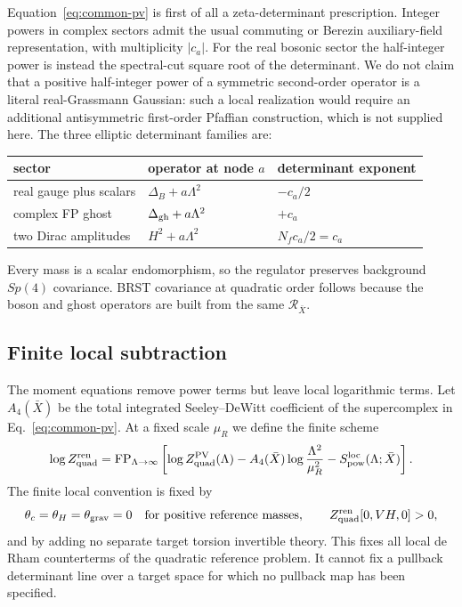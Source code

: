 \documentclass[11pt]{article}
\theoremstyle{definition}
\theoremstyle{remark}
\newcommand{\cR}{\mathcal R}
\newcommand{\FP}{\operatorname{FP}}
\begin{document}
Equation~\eqref{eq:common-pv} is first of all a zeta-determinant
prescription.  Integer powers in complex sectors admit the usual commuting
or Berezin auxiliary-field representation, with multiplicity \(|c_a|\).
For the real bosonic sector the half-integer power is instead the spectral-cut
square root of the determinant.  We do not claim that a positive half-integer
power of a symmetric second-order operator is a literal real-Grassmann
Gaussian: such a local realization would require an additional
antisymmetric first-order Pfaffian construction, which is not supplied here.
The three elliptic determinant families are:
\begin{center}
\begin{tabular}{L{0.24\textwidth}L{0.27\textwidth}L{0.36\textwidth}}
\toprule
sector & operator at node \(a\) & determinant exponent\\
\midrule
real gauge plus scalars & \(\Delta_B+a\Lambda^2\) & \(-c_a/2\)\\
complex FP ghost & \(\Delta_{\rm gh}+a\Lambda^2\) & \(+c_a\)\\
two Dirac amplitudes & \(H^2+a\Lambda^2\) & \(N_fc_a/2=c_a\)\\
\bottomrule
\end{tabular}
\end{center}
Every mass is a scalar endomorphism, so the regulator preserves background
\(Sp(4)\) covariance.  BRST covariance at quadratic order follows because
the boson and ghost operators are built from the same \(\cR_{\bar X}\).

\subsection{Finite local subtraction}

The moment equations remove power terms but leave local logarithmic terms.
Let \(A_4(\bar X)\) be the total integrated Seeley--DeWitt coefficient of
the supercomplex in Eq.~\eqref{eq:common-pv}.  At a fixed scale \(\mu_R\)
we define the finite scheme
\begin{equation}
 \log Z_{\rm quad}^{\rm ren}
 =\FP_{\Lambda\to\infty}
 \left[\log Z_{\rm quad}^{\rm PV}(\Lambda)
       -A_4(\bar X)\log\frac{\Lambda^2}{\mu_R^2}
       -S_{\rm pow}^{\rm loc}(\Lambda;\bar X)\right].
 \label{eq:finite-part}
\end{equation}
The finite local convention is fixed by
\begin{equation}
 \theta_c=\theta_H=\theta_{\rm grav}=0
 \quad\hbox{for positive reference masses},
 \qquad
 Z_{\rm quad}^{\rm ren}[0,VH,0]>0,
 \label{eq:finite-convention}
\end{equation}
and by adding no separate target torsion invertible theory.  This fixes all
local de Rham counterterms of the quadratic reference problem.  It cannot
fix a pullback determinant line over a target space for which no pullback
map has been specified.
\end{document}
